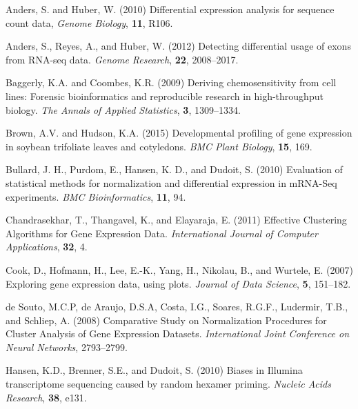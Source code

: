 \documentclass{bioinfo}
\begin{document}
\begin{thebibliography}{}


Anders, S. and Huber, W. (2010) Differential expression analysis for sequence count data, {\it Genome Biology}, {\bf 11}, R106.

Anders, S., Reyes, A., and Huber, W. (2012) Detecting differential usage of exons from RNA-seq data. {\it Genome Research}, {\bf 22}, 2008--2017.

Baggerly, K.A. and Coombes, K.R. (2009) Deriving chemosensitivity from cell lines: Forensic bioinformatics and reproducible research in high-throughput biology. {\it The Annals of Applied Statistics}, {\bf 3}, 1309--1334.

Brown, A.V. and Hudson, K.A. (2015) Developmental profiling of gene expression in soybean trifoliate leaves and cotyledons. {\it BMC Plant Biology}, {\bf 15}, 169.

Bullard, J. H., Purdom, E., Hansen, K. D., and Dudoit, S. (2010) Evaluation of statistical methods for normalization and differential expression in mRNA-Seq experiments. {\it BMC Bioinformatics}, {\bf 11}, 94.

Chandrasekhar, T., Thangavel, K., and Elayaraja, E. (2011) Effective Clustering Algorithms for
Gene Expression Data. {\it International Journal of Computer Applications}, {\bf 32}, 4.

Cook, D., Hofmann, H., Lee, E.-K., Yang, H., Nikolau, B., and Wurtele, E. (2007) Exploring gene expression data, using plots. {\it Journal of Data Science}, {\bf 5}, 151--182.

de Souto, M.C.P, de Araujo, D.S.A, Costa, I.G., Soares, R.G.F., Ludermir, T.B., and Schliep, A. (2008) Comparative Study on Normalization Procedures for Cluster Analysis of Gene Expression Datasets. {\it International Joint Conference on Neural Networks}, 2793--2799.

Hansen, K.D., Brenner, S.E., and Dudoit, S. (2010) Biases in Illumina transcriptome sequencing caused by random hexamer priming. {\it Nucleic Acids Research}, {\bf 38}, e131.


\end{thebibliography}
\end{document}
